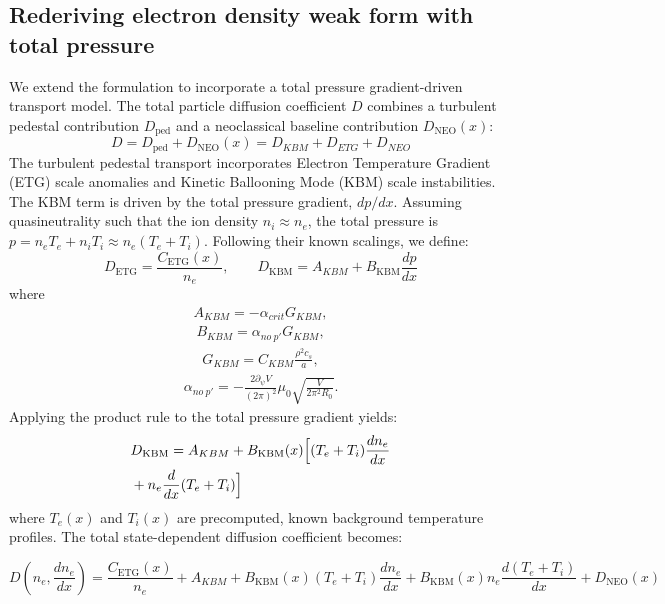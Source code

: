 \documentclass[twocolumn,secnumarabic,amssymb, nobibnotes, aps, prd]{revtex4-2}
\renewcommand{\ne}{n_{e}}  %
\newcommand{\Dped}{D_{\mathrm{ped}}}
\begin{document}
\subsection{Rederiving electron density weak form with total pressure}
\label{sec:ne-weak-total-pressure}

We extend the formulation to incorporate a total pressure gradient-driven transport model. The total particle diffusion coefficient $D$ combines a turbulent pedestal contribution $\Dped$ and a neoclassical baseline contribution $D_{\mathrm{NEO}}(x)$:
\begin{equation}
D = \Dped + D_{\mathrm{NEO}}(x) = D_{KBM} + D_{ETG} + D_{NEO}
\end{equation}
The turbulent pedestal transport incorporates Electron Temperature Gradient (ETG) scale anomalies and Kinetic Ballooning Mode (KBM) scale instabilities. The KBM term is driven by the total pressure gradient, $dp/dx$. Assuming quasineutrality such that the ion density $n_i \approx \ne$, the total pressure is $p = \ne T_e + n_i T_i \approx \ne (T_e + T_i)$. Following their known scalings, we define:
\begin{equation}
D_{\mathrm{ETG}} = \frac{C_{\mathrm{ETG}}(x)}{\ne}, \qquad D_{\mathrm{KBM}} = A_{KBM}+B_{\mathrm{KBM}} \frac{dp}{dx}
\end{equation}
where
\begin{align}
    A_{KBM} = -\alpha_{crit}G_{KBM},
\end{align}
\begin{align}
    B_{KBM} = \alpha_{no~p'} G_{KBM},
\end{align}
\begin{align}
    G_{KBM} = C_{KBM} \frac{\rho^2 c_s}{a},
\end{align}
\begin{align}
    \alpha_{no~p'} = -\frac{2 \partial_\psi V}{(2\pi)^2}\mu_0\sqrt{\frac{V}{2\pi^2R_0}}.
\end{align}
Applying the product rule to the total pressure gradient yields:
\begin{align}
&D_{\mathrm{KBM}} = A_{KBM}+B_{\mathrm{KBM}}(x) \Big[ (T_e + T_i) \frac{d\ne}{dx} 
\notag \\ & + \ne \frac{d}{dx}(T_e + T_i) \Big]
\end{align}
where $T_e(x)$ and $T_i(x)$ are precomputed, known background temperature profiles. The total state-dependent diffusion coefficient becomes:
\begin{widetext}
\begin{equation}
D\left(\ne, \frac{d\ne}{dx}\right) = \frac{C_{\mathrm{ETG}}(x)}{\ne} + A_{KBM} + B_{\mathrm{KBM}}(x) (T_e + T_i) \frac{d\ne}{dx} + B_{\mathrm{KBM}}(x) \ne \frac{d(T_e + T_i)}{dx} + D_{\mathrm{NEO}}(x)
\end{equation}
\end{widetext}
\end{document}
